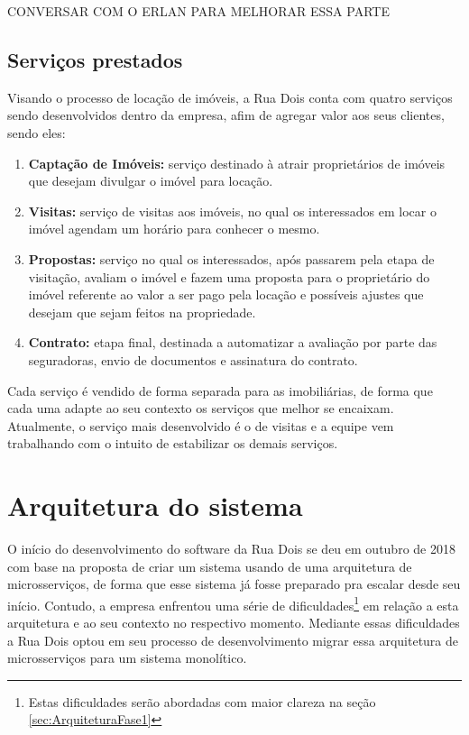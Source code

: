 CONVERSAR COM O ERLAN PARA MELHORAR ESSA PARTE


\subsection{Serviços prestados}

Visando o processo de locação de imóveis, a Rua Dois conta com quatro serviços
sendo desenvolvidos dentro da empresa, afim de agregar valor aos seus clientes,
sendo eles:

  \begin{enumerate}
    \item \textbf{Captação de Imóveis:} serviço destinado à atrair proprietários de
      imóveis que desejam divulgar o imóvel para locação.
    \item \textbf{Visitas:} serviço de visitas aos imóveis, no qual os interessados em
      locar o imóvel agendam um horário para conhecer o mesmo.
    \item \textbf{Propostas:} serviço no qual os interessados, após passarem pela etapa
      de visitação, avaliam o imóvel e fazem uma proposta para o proprietário do
      imóvel referente ao valor a ser pago pela locação e possíveis ajustes que
      desejam que sejam feitos na propriedade.
    \item \textbf{Contrato:} etapa final, destinada a automatizar a avaliação por parte
      das seguradoras, envio de documentos e assinatura do contrato.
  \end{enumerate}

Cada serviço é vendido de forma separada para as imobiliárias, de forma que cada uma
adapte ao seu contexto os serviços que melhor se encaixam. Atualmente, o serviço
mais desenvolvido é o de visitas e a equipe vem trabalhando com o intuito de
estabilizar os demais serviços.

\section{Arquitetura do sistema}
\label{sec:ArquiteturaDoSistema}

O início do desenvolvimento do software da Rua Dois se deu em outubro de 2018 com
base na proposta de criar um sistema usando de uma arquitetura de microsserviços, de
forma que esse sistema já fosse preparado pra escalar desde seu início. Contudo,
a empresa enfrentou uma série de dificuldades\footnote{Estas dificuldades serão abordadas
com maior clareza na seção \ref{sec:ArquiteturaFase1}} em relação a esta arquitetura e ao seu
contexto no respectivo momento. Mediante essas dificuldades a Rua Dois optou em seu
processo de desenvolvimento migrar essa arquitetura de microsserviços para um sistema
monolítico.

